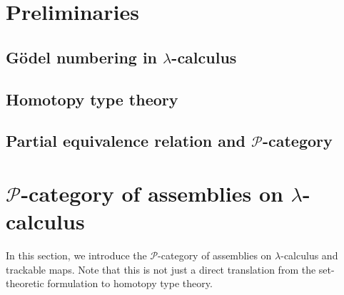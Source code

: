 \documentclass[a4paper,UKenglish,numberwithinsect,cleveref,thm-restate]{lipics-v2021}
\newcommand{\PP}{\mathscr{P}}
\theoremstyle{plain}
\begin{document}
\section{Preliminaries}\label{sec:preliminaries}

\subsection{Gödel numbering in \texorpdfstring{$\lambda$}{λ}-calculus}
\subsection{Homotopy type theory}
\subsection{Partial equivalence relation and \texorpdfstring{$\PP$}{P}-category}

\section{\texorpdfstring{$\PP$}{P}-category of assemblies on \texorpdfstring{$\lambda$}{λ}-calculus}\label{sec:assemblies}
In this section, we introduce the $\PP$-category of assemblies on $\lambda$-calculus and trackable maps.
Note that this is not just a direct translation from the set-theoretic formulation to homotopy type theory.
\end{document}
